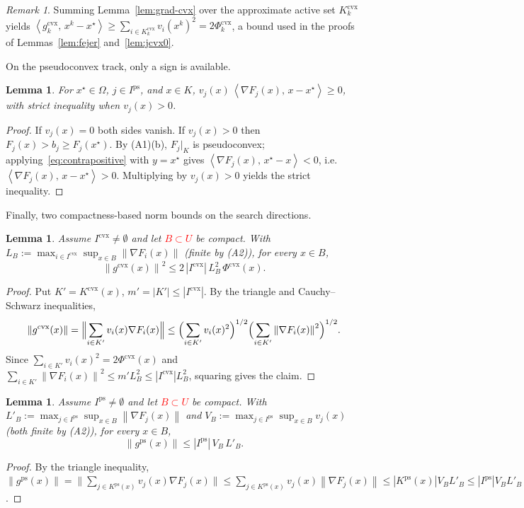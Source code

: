 \documentclass[]{interact}
\theoremstyle{plain}
\newtheorem{lemma}[theorem]{Lemma}
\theoremstyle{definition}
\theoremstyle{remark}
\newtheorem{remark}{Remark}
\newcommand{\norm}[1]{\left\lVert #1 \right\rVert}
\newcommand{\abs}[1]{\left\lvert #1 \right\rvert}
\newcommand{\inner}[2]{\left\langle #1,\, #2 \right\rangle}
\newcommand{\cvx}{\mathrm{cvx}}
\newcommand{\ps}{\mathrm{ps}}
\begin{document}
\begin{remark}\label{rem:grad-cvx-sum}
Summing Lemma~\ref{lem:grad-cvx} over the approximate active set $K^{\cvx}_k$ yields
$\inner{g^{\cvx}_k}{x^k-x^\star}\ge\sum_{i\in K^{\cvx}_k}v_i(x^k)^2=2\Phi^{\cvx}_k$, a bound
used in the proofs of Lemmas~\ref{lem:fejer} and~\ref{lem:jcvx0}.
\end{remark}

On the pseudoconvex track, only a sign is available.

\begin{lemma}\label{lem:sign-ps}
For $x^\star\in\Omega$, $j\in I^{\ps}$, and $x\in K$,
$v_j(x)\,\inner{\nabla F_j(x)}{x-x^\star}\ge 0$, with strict inequality when $v_j(x)>0$.
\end{lemma}
\begin{proof}
If $v_j(x)=0$ both sides vanish. If $v_j(x)>0$ then $F_j(x)>b_j\ge F_j(x^\star)$. By
(A1)(b), $F_j|_K$ is pseudoconvex; applying~\eqref{eq:contrapositive}
with $y=x^\star$ gives $\inner{\nabla F_j(x)}{x^\star-x}<0$, i.e.
$\inner{\nabla F_j(x)}{x-x^\star}>0$. Multiplying by $v_j(x)>0$ yields the strict
inequality.
\end{proof}

Finally, two compactness-based norm bounds on the search directions.

\begin{lemma}\label{lem:bound-cvx}
Assume $I^{\cvx}\ne\emptyset$ and let \leavevmode\textcolor{red}{$B\subset U$} be compact. With
$L_B:=\max_{i\in I^{\cvx}}\sup_{x\in B}\norm{\nabla F_i(x)}$ (finite by (A2)), for every
$x\in B$,
\[
\norm{g^{\cvx}(x)}^2\le 2\,\abs{I^{\cvx}}\,L_B^2\,\Phi^{\cvx}(x).
\]
\end{lemma}
\begin{proof}
Put $K'=K^{\cvx}(x)$, $m'=\abs{K'}\le\abs{I^{\cvx}}$. By the triangle and Cauchy--Schwarz
inequalities,
\[
\norm{g^{\cvx}(x)}=\Bigl\|\sum_{i\in K'}v_i(x)\nabla F_i(x)\Bigr\|
\le\Bigl(\sum_{i\in K'}v_i(x)^2\Bigr)^{1/2}\Bigl(\sum_{i\in K'}\norm{\nabla F_i(x)}^2\Bigr)^{1/2}.
\]
Since $\sum_{i\in K'}v_i(x)^2=2\Phi^{\cvx}(x)$ and
$\sum_{i\in K'}\norm{\nabla F_i(x)}^2\le m'L_B^2\le\abs{I^{\cvx}}L_B^2$, squaring gives the
claim.
\end{proof}

\begin{lemma}\label{lem:bound-ps}
Assume $I^{\ps}\ne\emptyset$ and let \leavevmode\textcolor{red}{$B\subset U$} be compact. With
$L'_B:=\max_{j\in I^{\ps}}\sup_{x\in B}\norm{\nabla F_j(x)}$ and
$V_B:=\max_{j\in I^{\ps}}\sup_{x\in B}v_j(x)$ (both finite by (A2)), for every $x\in B$,
\[
\norm{g^{\ps}(x)}\le\abs{I^{\ps}}\,V_B\,L'_B .
\]
\end{lemma}
\begin{proof}
By the triangle inequality,
$\norm{g^{\ps}(x)}=\bigl\|\sum_{j\in K^{\ps}(x)}v_j(x)\nabla F_j(x)\bigr\|
\le\sum_{j\in K^{\ps}(x)}v_j(x)\norm{\nabla F_j(x)}\le\abs{K^{\ps}(x)}V_BL'_B
\le\abs{I^{\ps}}V_BL'_B$.
\end{proof}
\end{document}
